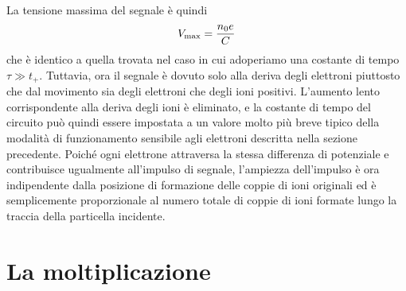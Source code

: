 \begin{approfondimento}
\begin{figure}[H]
      \centering
   \end{figure}
   La tensione massima del segnale è quindi
   \begin{equation*}
      V_{\rm max}=\frac{n_0 e}{C}
   \end{equation*}
   che è identico a quella trovata nel caso in cui adoperiamo una costante di tempo $\tau \gg t_+$. Tuttavia, ora il segnale è dovuto solo alla deriva degli elettroni piuttosto che dal movimento sia degli elettroni che degli ioni positivi. L'aumento lento corrispondente alla deriva degli ioni è eliminato, e la costante di tempo del circuito può quindi essere impostata a un valore molto più breve tipico della modalità di funzionamento sensibile agli elettroni descritta nella sezione precedente. Poiché ogni elettrone attraversa la stessa differenza di potenziale e contribuisce ugualmente all'impulso di segnale, l'ampiezza dell'impulso è ora indipendente dalla posizione di formazione delle coppie di ioni originali ed è semplicemente proporzionale al numero totale di coppie di ioni formate lungo la traccia della particella incidente.
\end{approfondimento}

\vfill

\section{La moltiplicazione}

